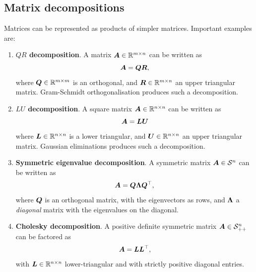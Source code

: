 \documentclass[11pt,a4paper]{memoir}
\begin{document}
\subsection{Matrix decompositions} Matrices can be represented as products of simpler matrices. Important examples are:
\begin{enumerate}
 \item {}\textbf{$QR$ decomposition}. A matrix $\bm{A}\in \mathbb{R}^{m\times n}$ can be written as
 \begin{equation*}
  \bm{A} = \bm{Q}\bm{R},
 \end{equation*}
where $\bm{Q}\in \mathbb{R}^{m\times m}$ is an orthogonal, and $\bm{R}\in \mathbb{R}^{m\times n}$ an upper triangular matrix. Gram-Schmidt orthogonalisation produces such a decomposition.
 \item {}\textbf{$LU$ decomposition}. A square matrix $\bm{A}\in \mathbb{R}^{n\times n}$ can be written as
 \begin{equation*}
  \bm{A} = \bm{L}\bm{U}
 \end{equation*}
where $\bm{L}\in \mathbb{R}^{n\times n}$ is a lower triangular, and $\bm{U}\in \mathbb{R}^{n\times n}$ an upper triangular matrix. Gaussian eliminations produces such a decomposition.
 \item {}\textbf{Symmetric eigenvalue decomposition}. A symmetric matrix $\bm{A}\in \mathcal{S}^n$ can be written as
 \begin{equation*}
  \bm{A} = \bm{Q}\bm{\Lambda} \bm{Q}^{\top},
 \end{equation*}
where $\bm{Q}$ is an orthogonal matrix, with the eigenvectors as rows, and $\bm{\Lambda}$ a {\em diagonal} matrix with the eigenvalues on the diagonal.
\item {}\textbf{Cholesky decomposition}. A positive definite symmetric matrix $\bm{A}\in \mathcal{S}_{++}^n$ can be factored as
\begin{equation*}
\bm{A} = \bm{L}\bm{L}^{\top},
\end{equation*}
with $\bm{L}\in \mathbb{R}^{n\times n}$ lower-triangular and with strictly positive diagonal entries.
\end{enumerate}
\end{document}
